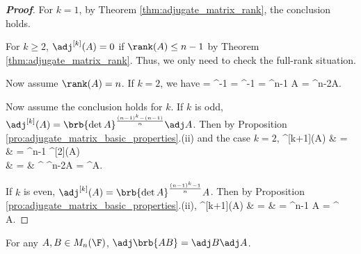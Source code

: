 \begin{proof}[\bf Proof]
For $k=1$, by Theorem \ref{thm:adjugate_matrix_rank}, the conclusion holds.

For $k\geq 2$, $\adj^{[k]}(A) = 0$ if $\rank(A)\leq n-1$ by Theorem \ref{thm:adjugate_matrix_rank}. Thus, we only need to check the full-rank situation.

Now assume $\rank(A)=n$. If $k=2$, we have
\be
\adj{} = \det{} ^{-1} = \det{} ^{-1} = ^{n-1} \det{} A = ^{n-2}A.
\ee

Now assume the conclusion holds for $k$. If $k$ is odd, $\adj^{[k]}(A) = \brb{\det A}^{\frac{(n-1)^k-(n-1)}{n}}\adj A$. Then by Proposition \ref{pro:adjugate_matrix_basic_properties}.(ii) and the case $k=2$,
\beast
\adj^{[k+1]}(A) & = & \adj{} = ^{n-1} \adj^{[2]}(A)\\
& = & ^{} ^{n-2}A = ^{}A.
\eeast

If $k$ is even, $\adj^{[k]}(A) = \brb{\det A}^{\frac{(n-1)^k-1}{n}} A$. Then by Proposition \ref{pro:adjugate_matrix_basic_properties}.(ii),
\beast
\adj^{[k+1]}(A) & = & \adj{} = ^{n-1} \adj A = ^{} \adj A.
\eeast
\end{proof}


\begin{theorem}\label{thm:adjugate_matrix_product}
For any $A,B\in M_n(\F)$, $\adj\brb{AB} = \adj B \adj A$.
\end{theorem}

